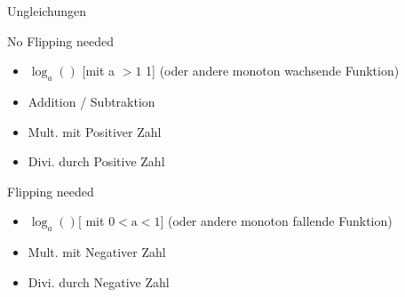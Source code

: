 \begin{KR}{Ungleichungen}

No Flipping needed
    \begin{itemize}
  \item $\log _{a}()$ [mit a $>1$ 1] (oder andere monoton wachsende Funktion)
  \item Addition / Subtraktion
  \item Mult. mit Positiver Zahl
  \item Divi. durch Positive Zahl
\end{itemize}

Flipping needed

\begin{itemize}
  \item $\log _{a}()[$ mit $0<\mathrm{a}<1]$ (oder andere monoton fallende Funktion)
  \item Mult. mit Negativer Zahl
  \item Divi. durch Negative Zahl
\end{itemize}
\end{KR}